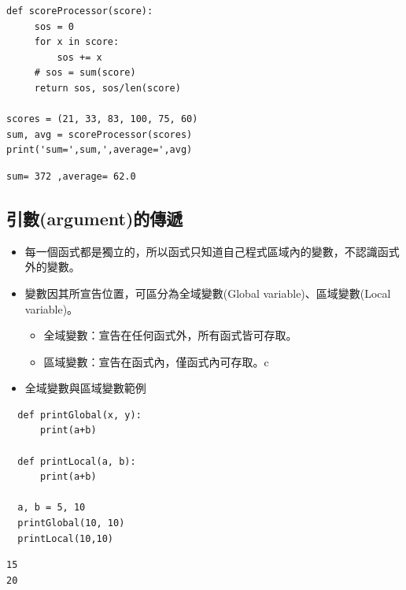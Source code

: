 \documentclass[a4paper,12pt]{article}
\begin{document}
\begin{enumerate}
\lstset{breaklines=true,language=Python,label= ,caption= ,captionpos=b,firstnumber=1,numbers=left}
\begin{lstlisting}
def scoreProcessor(score):
     sos = 0
     for x in score:
         sos += x
     # sos = sum(score)
     return sos, sos/len(score)

scores = (21, 33, 83, 100, 75, 60)
sum, avg = scoreProcessor(scores)
print('sum=',sum,',average=',avg)
\end{lstlisting}

\begin{verbatim}
sum= 372 ,average= 62.0
\end{verbatim}
\end{enumerate}

\subsection{引數(argument)的傳遞}
\label{sec:org66ae7df}
\begin{itemize}
\item 每一個函式都是獨立的，所以函式只知道自己程式區域內的變數，不認識函式外的變數。\\
\item 變數因其所宣告位置，可區分為全域變數(Global variable)、區域變數(Local variable)。\\
\begin{itemize}
\item 全域變數：宣告在任何函式外，所有函式皆可存取。\\
\item 區域變數：宣告在函式內，僅函式內可存取。c\\
\end{itemize}
\item 全域變數與區域變數範例\\
\end{itemize}
\lstset{breaklines=true,language=Python,label= ,caption= ,captionpos=b,firstnumber=1,numbers=left}
\begin{lstlisting}
  def printGlobal(x, y):
      print(a+b)

  def printLocal(a, b):
      print(a+b)

  a, b = 5, 10
  printGlobal(10, 10)
  printLocal(10,10)
\end{lstlisting}

\begin{verbatim}
15
20
\end{verbatim}
\end{document}
